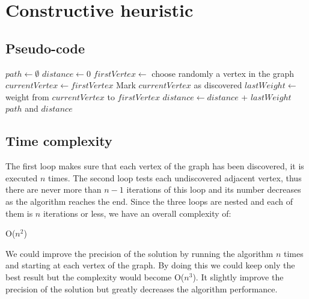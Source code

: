 \documentclass[a4paper, 12pt]{report}
\begin{document}
	\chapter{Constructive heuristic}

		\section{Pseudo-code}
			\begin{algorithm}
				\DontPrintSemicolon
				\BlankLine
				$path \leftarrow \emptyset$\;
				$distance \leftarrow 0$\;
				$firstVertex \leftarrow$ choose randomly a vertex in the graph\;
				$currentVertex \leftarrow firstVertex$\;
				Mark $currentVertex$ as discovered\;
				\BlankLine
				\BlankLine
				$lastWeight \leftarrow$ weight from $currentVertex$ to $firstVertex$\;
				$distance \leftarrow distance$ + $lastWeight$\;
				\BlankLine
				\Return $path$ and $distance$\;
			\end{algorithm}

		\section{Time complexity}
			The first loop makes sure that each vertex of the graph has been discovered, it is executed $ n $ times.
			The second loop tests each undiscovered adjacent vertex, thus there are never more than $n-1$ iterations of this loop and its number decreases as the algorithm reaches the end.
			Since the three loops are nested and each of them is $n$ iterations or less, we have an overall complexity of:
			\begin{center}
				O($n^{2}$)
			\end{center}
			We could improve the precision of the solution by running the algorithm $n$ times and starting at each vertex of the graph. By doing this we could keep only the best result but the complexity would become O($n^{3}$). It slightly improve the precision of the solution but greatly decreases the algorithm performance.
\end{document}
